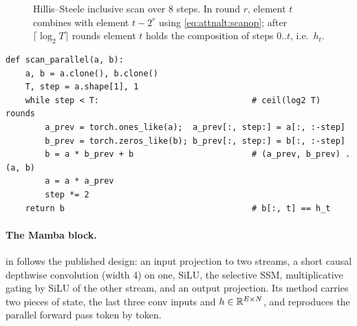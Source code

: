 \begin{figure}[t]
\centering
{}
\caption{Hillis--Steele inclusive scan over 8 steps. In round $r$, element $t$ combines with element
$t-2^r$ using \cref{eq:attnalt:scanop}; after $\lceil\log_2 T\rceil$ rounds element $t$ holds the
composition of steps $0..t$, i.e.\ $h_t$.}
\label{fig:attnalt:scan}
\end{figure}

\begin{lstlisting}[caption={Parallel scan for $h_t=a_th_{t-1}+b_t$ (\texttt{llmsys/ssm.py}).},label={lst:attnalt:scan}]
def scan_parallel(a, b):
    a, b = a.clone(), b.clone()
    T, step = a.shape[1], 1
    while step < T:                               # ceil(log2 T) rounds
        a_prev = torch.ones_like(a);  a_prev[:, step:] = a[:, :-step]
        b_prev = torch.zeros_like(b); b_prev[:, step:] = b[:, :-step]
        b = a * b_prev + b                        # (a_prev, b_prev) . (a, b)
        a = a * a_prev
        step *= 2
    return b                                      # b[:, t] == h_t
\end{lstlisting}

\paragraph{The Mamba block.}  in  follows the published design: an input
projection to two streams, a short causal depthwise convolution (width 4) on one, SiLU, the selective SSM,
multiplicative gating by SiLU of the other stream, and an output projection. Its  method
carries two pieces of state, the last three conv inputs and $h\in\mathbb{R}^{E\times N}$, and reproduces the
parallel forward pass token by token.


